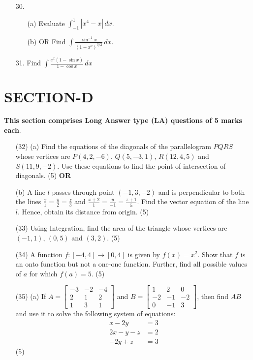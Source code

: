 \documentclass{article}
\begin{document}
\begin{enumerate}
\begin{enumerate}
\item[30.]
\begin{enumerate}
\item[(a)] Evaluate $\int_{-1}^{1} |x^4 - x| \, dx$.

\item[(b)] OR Find $\int \frac{\sin^{-1} x}{(1 - x^2)^{3/2}} \, dx$.
\end{enumerate}

\item[31.] Find $\int \frac{e^x (1 - \sin x)}{1 - \cos x} \, dx$
\end{enumerate}
\section*{SECTION-D}
\textbf{This section comprises Long Answer type (LA) questions of 5 marks each}.

\begin{enumerate}
\item[(32)] (a) Find the equations of the diagonals of the parallelogram $PQRS$ whose vertices are $P(4, 2, -6)$, $Q(5, -3, 1)$, $R(12, 4, 5)$ and $S(11, 9, -2)$. Use these equations to find the point of intersection of diagonals. \hfill (5)
\textbf{OR}

(b) A line $l$ passes through point $(-1, 3, -2)$ and is perpendicular to both the lines $\frac{x}{1} = \frac{y}{2} = \frac{z}{3}$ and $\frac{x + 2}{1} = \frac{y}{-1} = \frac{z + 1}{5}$. Find the vector equation of the line $l$. Hence, obtain its distance from origin. \hfill (5)

\item[(33)] Using Integration, find the area of the triangle whose vertices are $(-1, 1)$, $(0, 5)$ and $(3, 2)$. \hfill (5)

\item[(34)] A function $f: [-4, 4] \to [0, 4]$ is given by $f(x) = x^2$. Show that $f$ is an onto function but not a one-one function. Further, find all possible values of $a$ for which $f(a) = 5$. \hfill (5)

\item[(35)] (a) If $A = \begin{bmatrix} -3 & -2 & -4 \\ 2 & 1 & 2 \\ 1 & 3 & 1 \end{bmatrix}$ and $B = \begin{bmatrix} 1 & 2 & 0 \\ -2 & -1 & -2 \\ 0 & -1 & 3 \end{bmatrix}$, then find $AB$ and use it to solve the following system of equations:
\[
\begin{aligned}
x - 2y &= 3 \\
2x - y - z &= 2 \\
-2y + z &= 3
\end{aligned}
\]
\hfill (5)


\end{enumerate}
\end{enumerate}
\end{document}
